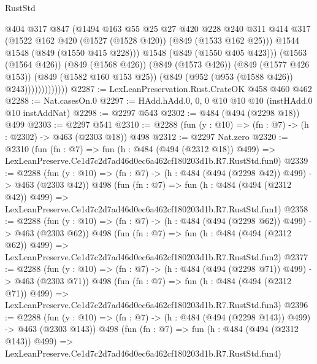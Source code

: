 \begin{lexlean}{RustStd}
\begin{coremodule}
                            @404
                            @317
                            @847
                            (@1494
                              @163
                              @55
                              @25
                              @27
                              @420
                              @228
                              @240
                              @311
                              @414
                              @317
                              (@1522 @162 @420 (@1527 (@1528 @420)) (@849 (@1533 @162 @25)))
                              @1544
                              @1548
                              (@849 (@1550 @415 @228)))
                            @1548
                            (@849 (@1550 @405 @423)))
                          (@1563 (@1564 @426))
                          (@849 (@1568 @426))
                          (@849 (@1573 @426))
                          (@849 (@1577 @426 @153))
                          (@849 (@1582 @160 @153 @25))
                          (@849 (@952 (@953 (@1588 @426)) @243)))))))))))))
@2287 := LexLeanPreservation.Rust.CrateOK @458 @460 @462
@2288 := Nat.casesOn.{0}
@2297 := HAdd.hAdd.{0, 0, 0} @10 @10 @10 (instHAdd.{0} @10 instAddNat)
@2298 := @2297 @543
@2302 := @484 (@494 (@2298 @18)) @499
@2303 := @2297 @541
@2310 := @2288 (fun (y : @10) => (fn : @7) -> (h : @2302) -> @463 (@2303 @18)) @498
@2312 := @2297 Nat.zero
@2320 := @2310
    (fun (fn : @7) =>
    fun (h : @484 (@494 (@2312 @18)) @499) =>
    LexLeanPreserve.Ce1d7c2d7ad46d0ec6a462cf180203d1b.R7.RustStd.fun0)
@2339 := @2288
    (fun (y : @10) => (fn : @7) -> (h : @484 (@494 (@2298 @42)) @499) -> @463 (@2303 @42))
    @498
    (fun (fn : @7) =>
    fun (h : @484 (@494 (@2312 @42)) @499) =>
    LexLeanPreserve.Ce1d7c2d7ad46d0ec6a462cf180203d1b.R7.RustStd.fun1)
@2358 := @2288
    (fun (y : @10) => (fn : @7) -> (h : @484 (@494 (@2298 @62)) @499) -> @463 (@2303 @62))
    @498
    (fun (fn : @7) =>
    fun (h : @484 (@494 (@2312 @62)) @499) =>
    LexLeanPreserve.Ce1d7c2d7ad46d0ec6a462cf180203d1b.R7.RustStd.fun2)
@2377 := @2288
    (fun (y : @10) => (fn : @7) -> (h : @484 (@494 (@2298 @71)) @499) -> @463 (@2303 @71))
    @498
    (fun (fn : @7) =>
    fun (h : @484 (@494 (@2312 @71)) @499) =>
    LexLeanPreserve.Ce1d7c2d7ad46d0ec6a462cf180203d1b.R7.RustStd.fun3)
@2396 := @2288
    (fun (y : @10) => (fn : @7) -> (h : @484 (@494 (@2298 @143)) @499) -> @463 (@2303 @143))
    @498
    (fun (fn : @7) =>
    fun (h : @484 (@494 (@2312 @143)) @499) =>
    LexLeanPreserve.Ce1d7c2d7ad46d0ec6a462cf180203d1b.R7.RustStd.fun4)

\end{coremodule}
\end{lexlean}
